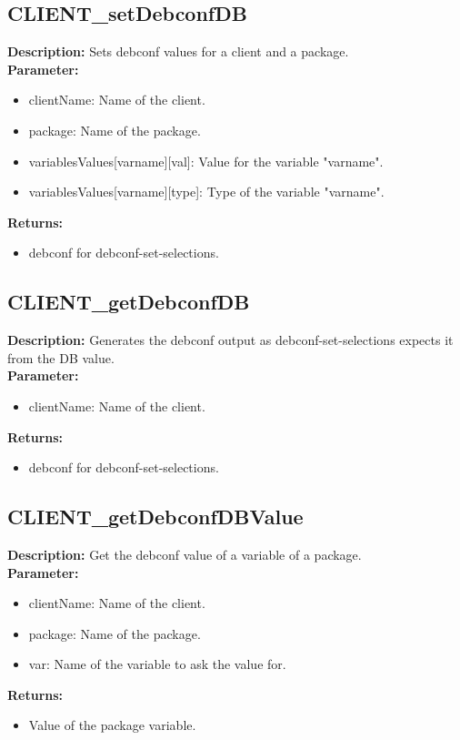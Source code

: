 \subsection{CLIENT\_setDebconfDB}
\textbf{Description:} Sets debconf values for a client and a package.\\
\textbf{Parameter:}
\begin{itemize}
\item clientName: Name of the client.
\item package: Name of the package.
\item variablesValues[varname][val]: Value for the variable "varname".
\item variablesValues[varname][type]: Type of the variable "varname".
\end{itemize}
\textbf{Returns:}
\begin{itemize}
\item debconf for debconf-set-selections.
\end{itemize}

\subsection{CLIENT\_getDebconfDB}
\textbf{Description:} Generates the debconf output as debconf-set-selections expects it from the DB value.\\
\textbf{Parameter:}
\begin{itemize}
\item clientName: Name of the client.
\end{itemize}
\textbf{Returns:}
\begin{itemize}
\item debconf for debconf-set-selections.
\end{itemize}

\subsection{CLIENT\_getDebconfDBValue}
\textbf{Description:} Get the debconf value of a variable of a package.\\
\textbf{Parameter:}
\begin{itemize}
\item clientName: Name of the client.
\item package: Name of the package.
\item var: Name of the variable to ask the value for.
\end{itemize}
\textbf{Returns:}
\begin{itemize}
\item Value of the package variable.
\end{itemize}

